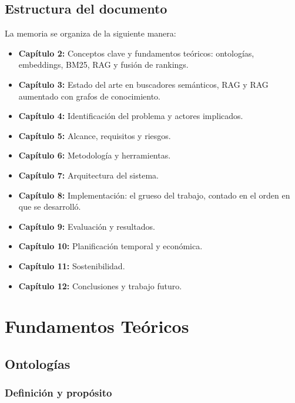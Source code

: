 \documentclass[12pt, a4paper, twoside]{report}
\begin{document}
\section{Estructura del documento}

La memoria se organiza de la siguiente manera:

\begin{itemize}
  \item \textbf{Cap\'itulo 2:} Conceptos clave y fundamentos te\'oricos: ontolog\'ias, embeddings, BM25, RAG y fusi\'on de rankings.
  \item \textbf{Cap\'itulo 3:} Estado del arte en buscadores sem\'anticos, RAG y RAG aumentado con grafos de conocimiento.
  \item \textbf{Cap\'itulo 4:} Identificaci\'on del problema y actores implicados.
  \item \textbf{Cap\'itulo 5:} Alcance, requisitos y riesgos.
  \item \textbf{Cap\'itulo 6:} Metodolog\'ia y herramientas.
  \item \textbf{Cap\'itulo 7:} Arquitectura del sistema.
  \item \textbf{Cap\'itulo 8:} Implementaci\'on: el grueso del trabajo, contado en el orden en que se desarroll\'o.
  \item \textbf{Cap\'itulo 9:} Evaluaci\'on y resultados.
  \item \textbf{Cap\'itulo 10:} Planificaci\'on temporal y econ\'omica.
  \item \textbf{Cap\'itulo 11:} Sostenibilidad.
  \item \textbf{Cap\'itulo 12:} Conclusiones y trabajo futuro.
\end{itemize}


\chapter{Fundamentos Te\'oricos}
\label{ch:fundamentos}

\section{Ontolog\'ias}

\subsection{Definici\'on y prop\'osito}
\end{document}
